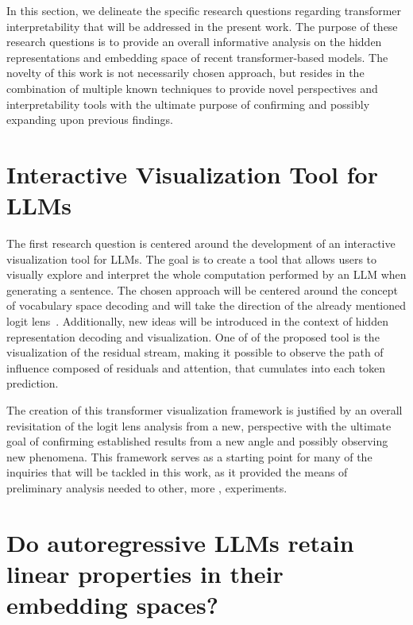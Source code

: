 In this section, we delineate the specific research questions regarding transformer interpretability that will be addressed in the present work.
The purpose of these research questions is to provide an overall informative analysis on the hidden representations and embedding space of recent transformer-based models.
The novelty of this work is not necessarily  chosen approach, but resides in the combination of multiple known techniques to provide novel perspectives and interpretability tools with the ultimate purpose of confirming and possibly expanding upon previous findings.

\section{Interactive Visualization Tool for LLMs}


The first research question is centered around the development of an interactive visualization tool for LLMs.
The goal is to create a tool that allows users to visually explore and interpret the whole computation performed by an LLM when generating a sentence.
The chosen approach will be centered around the concept of vocabulary space decoding and will take the direction of the already mentioned logit lens~\cite{nostalgebraist2020}.
Additionally, new ideas will be introduced in the context of hidden representation decoding and visualization.
One of  of the proposed tool is the visualization of the residual stream, making it possible to observe the path of influence composed of residuals and attention, that cumulates into each token prediction.

The creation of this transformer visualization framework is justified by an overall revisitation of the logit lens analysis from a new,  perspective with the ultimate goal of confirming established results from a new angle and possibly observing new phenomena.
This framework serves as a starting point for many of the inquiries that will be tackled in this work, as it provided the means of preliminary analysis needed to  other, more , experiments.

\section{Do autoregressive LLMs retain linear properties in their embedding spaces?}

